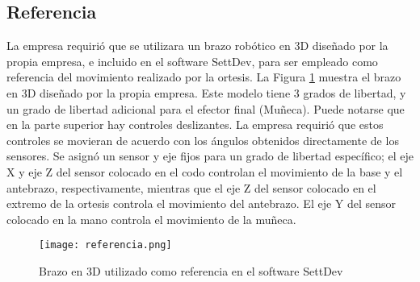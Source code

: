 \subsection{Referencia}

La empresa requirió que se utilizara un brazo robótico en 3D diseñado por la propia empresa, e incluido en el software SettDev, para ser empleado como referencia del movimiento realizado por la ortesis. La Figura \ref{fig:referencia} muestra el brazo en 3D diseñado por la propia empresa. Este modelo tiene 3 grados de libertad, y un grado de libertad adicional para el efector final (Muñeca). Puede notarse que en la parte superior hay controles deslizantes. La empresa requirió que estos controles se movieran de acuerdo con los ángulos obtenidos directamente de los sensores. Se asignó un sensor y eje fijos para un grado de libertad específico; el eje X y eje Z del sensor colocado en el codo controlan el movimiento de la base y el antebrazo, respectivamente, mientras que el eje Z del sensor colocado en el extremo de la ortesis controla el movimiento del antebrazo. El eje Y del sensor colocado en la mano controla el movimiento de la muñeca.

\begin{figure}[htb]
	\centering
	\texttt{[image: referencia.png]}
	\caption{Brazo en 3D utilizado como referencia en el software SettDev}
	\label{fig:referencia}
\end{figure}